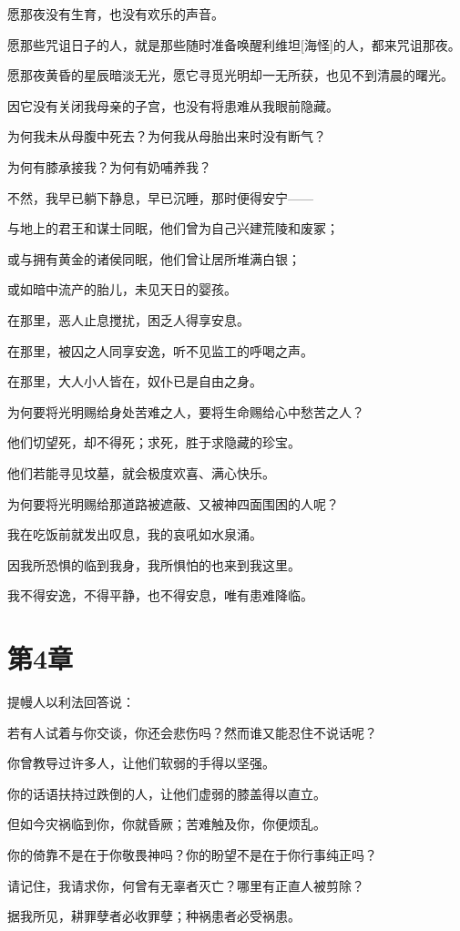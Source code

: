 \documentclass[12pt,oneside]{book}
\begin{document}
愿那夜没有生育，也没有欢乐的声音。

愿那些咒诅日子的人，就是那些随时准备唤醒利维坦[海怪]的人，都来咒诅那夜。

愿那夜黄昏的星辰暗淡无光，愿它寻觅光明却一无所获，也见不到清晨的曙光。

因它没有关闭我母亲的子宫，也没有将患难从我眼前隐藏。

为何我未从母腹中死去？为何我从母胎出来时没有断气？

为何有膝承接我？为何有奶哺养我？

不然，我早已躺下静息，早已沉睡，那时便得安宁——

与地上的君王和谋士同眠，他们曾为自己兴建荒陵和废冢；

或与拥有黄金的诸侯同眠，他们曾让居所堆满白银；

或如暗中流产的胎儿，未见天日的婴孩。

在那里，恶人止息搅扰，困乏人得享安息。

在那里，被囚之人同享安逸，听不见监工的呼喝之声。

在那里，大人小人皆在，奴仆已是自由之身。

为何要将光明赐给身处苦难之人，要将生命赐给心中愁苦之人？

他们切望死，却不得死；求死，胜于求隐藏的珍宝。

他们若能寻见坟墓，就会极度欢喜、满心快乐。

为何要将光明赐给那道路被遮蔽、又被神四面围困的人呢？

我在吃饭前就发出叹息，我的哀吼如水泉涌。

因我所恐惧的临到我身，我所惧怕的也来到我这里。

我不得安逸，不得平静，也不得安息，唯有患难降临。


\chapter{第4章}
提幔人以利法回答说：

若有人试着与你交谈，你还会悲伤吗？然而谁又能忍住不说话呢？

你曾教导过许多人，让他们软弱的手得以坚强。

你的话语扶持过跌倒的人，让他们虚弱的膝盖得以直立。

但如今灾祸临到你，你就昏厥；苦难触及你，你便烦乱。

你的倚靠不是在于你敬畏神吗？你的盼望不是在于你行事纯正吗？

请记住，我请求你，何曾有无辜者灭亡？哪里有正直人被剪除？

据我所见，耕罪孽者必收罪孽；种祸患者必受祸患。
\end{document}
